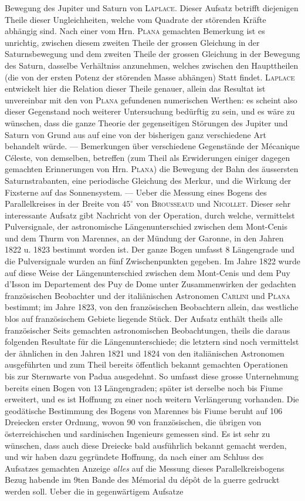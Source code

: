 Bewegung des Jupiter und Saturn von \textsc{Laplace}. Dieser Aufsatz betrifft diejenigen Theile dieser Ungleichheiten, welche vom Quadrate der störenden Kräfte abhängig sind. Nach einer vom Hrn. \textsc{Plana} gemachten Bemerkung ist es unrichtig, zwischen diesem zweiten Theile der grossen Gleichung in der Saturnsbewegung und dem zweiten Theile der grossen Gleichung in der Bewegung des Saturn, dasselbe Verhältniss anzunehmen, welches zwischen den Haupttheilen (die von der ersten Potenz der störenden Masse abhängen) Statt findet. \textsc{Laplace} entwickelt hier die Relation dieser Theile genauer, allein das Resultat ist unvereinbar mit den von \textsc{Plana} gefundenen numerischen Werthen: es scheint also dieser Gegenstand noch weiterer Untersuchung bedürftig zu sein, und es wäre zu wünschen, dass die ganze Theorie der gegenseitigen Störungen des Jupiter und Saturn von Grund aus auf eine von der bisherigen ganz verschiedene Art behandelt würde. --- Bemerkungen über verschiedene Gegenstände der Mécanique Céleste, von demselben, betreffen (zum Theil als Erwiderungen einiger dagegen gemachten Erinnerungen von Hrn. \textsc{Plana}) die Bewegung der Bahn des äussersten Saturnstrabanten, eine periodische Gleichung des Merkur, und die Wirkung der Fixsterne auf das Sonnensystem. --- Ueber die Messung eines Bogens des Parallelkreises in der Breite von $45^\circ$ von \textsc{Brousseaud} und \textsc{Nicollet}. Dieser sehr interessante Aufsatz gibt Nachricht von der Operation, durch welche, vermittelst Pulversignale, der astronomische Längenunterschied zwischen dem Mont-Cenis und dem Thurm von Marennes, an der Mündung der Garonne, in den Jahren 1822 u. 1823 bestimmt worden ist. Der ganze Bogen umfasst 8 Längengrade und die Pulversignale wurden an fünf Zwischenpunkten gegeben. Im Jahre 1822 wurde auf diese Weise der Längenunterschied zwischen dem Mont-Cenis und dem Puy d'Isson im Departement des Puy de Dome unter Zusammenwirken der gedachten französischen Beobachter und der italiänischen Astronomen \textsc{Carlini} und \textsc{Plana} bestimmt; im Jahre 1823, von den französischen Beobachtern allein, das westliche blos auf französischem Gebiete liegende Stück. Der Aufsatz enthält theils alle französischer Seits gemachten astronomischen Beobachtungen, theils die daraus folgenden Resultate für die Längenunterschiede; die letztern sind noch vermittelst der ähnlichen in den Jahren 1821 und 1824 von den italiänischen Astronomen ausgeführten und zum Theil bereits öffentlich bekannt gemachten Operationen bis zur Sternwarte von Padua ausgedehnt. So umfasst diese grosse Unternehmung bereits einen Bogen von 13 Längengraden; später ist derselbe noch bis Fiume erweitert, und es ist Hoffnung zu einer noch weitern Verlängerung vorhanden. Die geodätische Bestimmung des Bogens von Marennes bis Fiume beruht auf 106 Dreiecken erster Ordnung, wovon 90 von französischen, die übrigen von österreichischen und sardinischen Ingenieurs gemessen sind. Es ist sehr zu wünschen, dass auch diese Dreiecke bald ausführlich bekannt gemacht werden, und wir haben dazu gegründete Hoffnung, da nach einer am Schluss des Aufsatzes gemachten Anzeige \emph{alles} auf die Messung dieses Parallelkreisbogens Bezug habende im 9ten Bande des Mémorial du dépôt de la guerre gedruckt werden soll. Ueber die in gegenwärtigem Aufsatze 